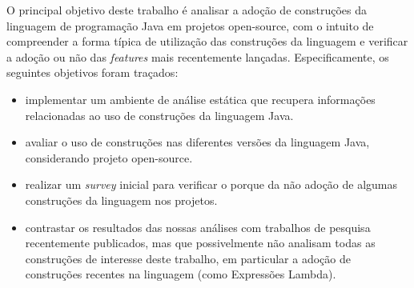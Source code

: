 	O principal objetivo deste trabalho é analisar a adoção de construções da linguagem de programação 
	Java em projetos open-source, com o intuito de compreender a forma típica de utilização das construções 
	da linguagem e verificar a adoção ou não das \textit{features} mais recentemente lançadas. Especificamente, 
	os seguintes objetivos foram traçados:
	
	\begin{itemize}
	  \item implementar um ambiente de análise estática que recupera informações relacionadas ao uso 
	    de construções da linguagem Java. 
	  
	  \item avaliar o uso de construções nas diferentes versões da linguagem Java, considerando 
	  projeto open-source. 
	  
	  \item realizar um \textit{survey} inicial para verificar o porque da não adoção de algumas construções 
	  da linguagem nos projetos. 
	  
	  \item contrastar os resultados das nossas análises com trabalhos de pesquisa recentemente publicados, 
	  mas que possivelmente não analisam todas as construções de interesse deste trabalho, em particular 
	  a adoção de construções recentes na linguagem (como Expressões Lambda). 
	\end{itemize}
	
%	

